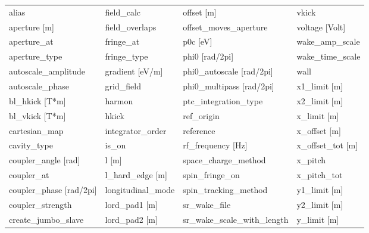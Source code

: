  \begin{tabular}{llll} \toprule
alias                          & field_calc                     & offset [m]                     & vkick                          \\
aperture [m]                   & field_overlaps                 & offset_moves_aperture          & voltage [Volt]                 \\
aperture_at                    & fringe_at                      & p0c [eV]                       & wake_amp_scale                 \\
aperture_type                  & fringe_type                    & phi0 [rad/2pi]                 & wake_time_scale                \\
autoscale_amplitude            & gradient [eV/m]                & phi0_autoscale [rad/2pi]       & wall                           \\
autoscale_phase                & grid_field                     & phi0_multipass [rad/2pi]       & x1_limit [m]                   \\
bl_hkick [T*m]                 & harmon                         & ptc_integration_type           & x2_limit [m]                   \\
bl_vkick [T*m]                 & hkick                          & ref_origin                     & x_limit [m]                    \\
cartesian_map                  & integrator_order               & reference                      & x_offset [m]                   \\
cavity_type                    & is_on                          & rf_frequency [Hz]              & x_offset_tot [m]               \\
coupler_angle [rad]            & l [m]                          & space_charge_method            & x_pitch                        \\
coupler_at                     & l_hard_edge [m]                & spin_fringe_on                 & x_pitch_tot                    \\
coupler_phase [rad/2pi]        & longitudinal_mode              & spin_tracking_method           & y1_limit [m]                   \\
coupler_strength               & lord_pad1 [m]                  & sr_wake_file                   & y2_limit [m]                   \\
create_jumbo_slave             & lord_pad2 [m]                  & sr_wake_scale_with_length      & y_limit [m]                    \\

\end{tabular}

